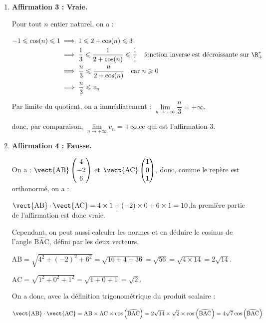 \begin{enumerate}
	\item \textbf{Affirmation 3 : Vraie.}

	Pour tout $n$ entier naturel, on a :

	$\begin{aligned}[t]
		-1 \leqslant \cos(n) \leqslant 1 &\implies 1\leqslant 2 + \cos(n) \leqslant 3\\
		&\implies \dfrac{1}{3} \leqslant \dfrac{1}{2+\cos(n)} \leqslant \dfrac{1}{1}\quad\text{fonction inverse est décroissante sur } \R_{+}^{*}\\
		&\implies \dfrac{n}{3} \leqslant \dfrac{n}{2 + \cos(n)}\quad \text{car } n\geqslant 0\\
		&\implies \dfrac{n}{3} \leqslant v_n
	\end{aligned}$

	Par limite du quotient, on a immédiatement : \quad$\lim\limits_{n \to +\infty} \dfrac{n}{3} = +\infty$,

	donc, par comparaison, \quad $\lim\limits_{n \to +\infty} v_n = +\infty$,\quad ce qui est l'affirmation 3.

	\item \textbf{Affirmation 4 : Fausse.}

	On a : $\vect{\mathrm{AB}}\begin{pmatrix}4\\-2\\6\end{pmatrix}$ et $\vect{\mathrm{AC}}\begin{pmatrix}1\\0\\1\end{pmatrix}$,
	donc, comme le repère est orthonormé, on a :

	$\vect{\mathrm{AB}}\cdot\vect{\mathrm{AC}} = 4\times 1 + (-2)\times 0 + 6 \times 1 = 10$,\quad la première partie de l'affirmation est donc vraie.

	Cependant, on peut aussi calculer les normes et en déduire le cosinus de l'angle $\widehat{\mathrm{BAC}}$, défini par les deux vecteurs.

	$\mathrm{AB} = \sqrt{4^2 + (-2)^2 + 6^2} = \sqrt{16 + 4 + 36} = \sqrt{56} = \sqrt{4 \times 14} = 2\sqrt{14}$.

	$\mathrm{AC} = \sqrt{1^2 + 0^2 + 1^2} = \sqrt{1 + 0 + 1} = \sqrt{2}$.

	On a donc, avec la définition trigonométrique du produit scalaire :

	$ \vect{\mathrm{AB}}\cdot\vect{\mathrm{AC}} = \mathrm{AB}\times \mathrm{AC}\times \cos\left(\widehat{\mathrm{BAC}}\right) = 2\sqrt{14}\times \sqrt{2} \times \cos\left(\widehat{\mathrm{BAC}}\right) = 4\sqrt{7}\cos\left(\widehat{\mathrm{BAC}}\right)$


\end{enumerate}
